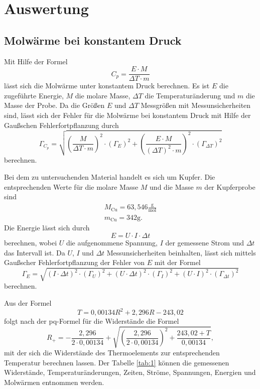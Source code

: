 \section{Auswertung}
\subsection{Molwärme bei konstantem Druck}
Mit Hilfe der Formel
\begin{equation}
  C_p = \frac{E \cdot M}{\Delta T \cdot m}
\end{equation}
lässt sich die Molwärme unter konstantem Druck berechnen.
Es ist $E$ die zugeführte Energie, $M$ die molare Masse, $\Delta T$ die Temperaturänderung und $m$ die Masse der Probe.
Da die Größen $E$ und $\Delta{T}$ Messgrößen mit Messunsicherheiten sind,
lässt sich der Fehler für die Molwärme bei konstantem Druck mit Hilfe der Gaußschen Fehlerfortpflanzung durch
\begin{equation}
  \Gamma_{C_p} = \sqrt{ (\frac{M}{\Delta{T}\cdot{m}})^2\cdot(\Gamma_E)^2 + (\frac{E\cdot{M}}{(\Delta{T})^2\cdot{m}})^2\cdot(\Gamma_{\Delta{T}})^2 }
\end{equation}
berechnen.

Bei dem zu untersuchenden Material handelt es sich um Kupfer.
Die entsprechenden Werte für die molare Masse $M$ \cite{cu} und die Masse $m$ der Kupferprobe sind
\begin{gather*}
  M_{\text{Cu}} = 63,546\frac{\text{g}}{\text{mol}} \\%
  m_{\text{Cu}} = 342\si{\gram}.
\end{gather*}
Die Energie lässt sich durch
\begin{equation}
  E = U\cdot I\cdot \Delta t
\end{equation}
berechnen, wobei $U$ die aufgenommene Spannung, $I$ der gemessene Strom und $\Delta t$ das Intervall ist.
Da $U$, $I$ und $\Delta{t}$ Messunsicherheiten beinhalten,
lässt sich mittels Gaußscher Fehlerfortpflanzung der Fehler von $E$ mit der Formel
\begin{equation}
  \Gamma_E = \sqrt{ (I\cdot\Delta{t})^2\cdot(\Gamma_U)^2 + (U\cdot\Delta{t})^2\cdot(\Gamma_I)^2 + (U\cdot{I})^2\cdot(\Gamma_{\Delta{t}})^2 }
\end{equation}
berechnen.

Aus der Formel
\begin{equation}
  T = 0,00134R^2 + 2,296R - 243,02
\end{equation}
folgt nach der pq-Formel für die Widerstände die Formel
\begin{equation}
  R_+ = -\frac{2,296}{2\cdot0,00134} + \sqrt{ \left(\frac{2,296}{2\cdot0,00134}\right)^2 + \frac{243,02 + T}{0,00134} },
  \end{equation}
mit der sich die Widerstände des Thermoelements zur entsprechenden Temperatur berechnen lassen.
Der Tabelle \ref{tab:1} können die gemessenen Widerstände, Temperaturänderungen, Zeiten, Ströme, Spannungen, Energien und Molwärmen entnommen werden.

